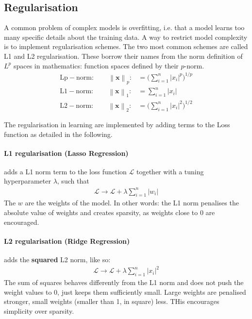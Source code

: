 \subsection{Regularisation}
A common problem of complex models is overfitting, i.e. that a model learns too
many specific details about the training data. A way to restrict model
complexity is to implement regularisation schemes. The two most common schemes
are called L1 and L2 regularisation. These borrow their names from the norm
definition of $L^p$ spaces in mathematics: function spaces defined by their
$p$-norm.
\begin{align}
  \mathrm{Lp-norm:}\qquad\left\|\mathbf {x} \right\|_{p}:&={\bigg (}\sum _{i=1}^{n}\left|x_{i}\right|^{p}{\bigg )}^{1/p}\\
  \mathrm{L1-norm:}\qquad\left\|\mathbf {x} \right\|_{1}:&=\sum _{i=1}^{n}\left|x_{i}\right|\\
  \mathrm{L2-norm:}\qquad\left\|\mathbf {x} \right\|_{2}:&={\bigg (}\sum _{i=1}^{n}\left|x_{i}\right|^{2}{\bigg )}^{1/2}
\end{align}

The regularisation in learning are implemented by adding terms to the Loss
function as detailed in the following.

\paragraph{L1 regularisation (Lasso Regression)} adds a L1 norm term to the loss
function $\mathcal{L}$ together with a tuning hyperparameter $\lambda$, such
that
\begin{align}
  \mathcal{L}\rightarrow \mathcal{L}+\lambda\sum _{i=1}^{n}\left|w_{i}\right|
\end{align}
The $w$ are the weights of the model. In other words: the L1 norm penalises the
absolute value of weights and creates sparsity, as weights close to 0 are
encouraged.
 

\paragraph{L2 regularisation (Ridge Regression)} adds the \textbf{squared} L2
norm, like so:
\begin{align}
  \mathcal{L}\rightarrow \mathcal{L}+\lambda\sum _{i=1}^{n}\left|x_{i}\right|^{2}
\end{align}
The sum of squares behaves differently from the L1 norm and does not push the
weight values to 0, just keeps them sufficiently small. Large weights are
penalised stronger, small weights (smaller than 1, in square) less. THis
encourages simplicity over sparsity.

